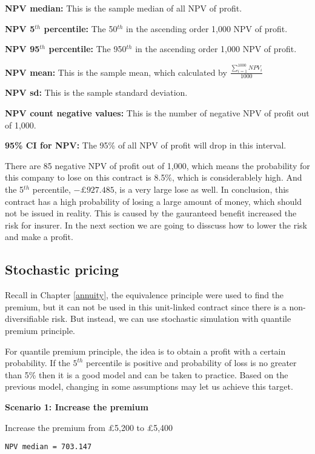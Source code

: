 \documentclass{report}
\begin{document}
{\textbf{NPV median:} This is the sample median of all NPV of profit.

\textbf{NPV 5$^{th}$ percentile:} The 50$^{th}$ in the ascending order 1,000 NPV of profit.

\textbf{NPV 95$^{th}$ percentile:} The 950$^{th}$ in the ascending order 1,000 NPV of profit.

\textbf{NPV mean:} This is the sample mean, which calculated by $\frac{\sum_{i=1}^{1000} NPV_i}{1000}$

\textbf{NPV sd:} This is the sample standard deviation. 

\textbf{NPV count negative values:} This is the number of negative NPV of profit out of 1,000.

\textbf{95\% CI for NPV:} The 95\% of all NPV of profit will drop in this interval.


There are 85 negative NPV of profit out of 1,000, which means the probability for this company to lose on this contract is 8.5\%, which is considerablely high. And the 5$^{th}$ percentile, ${-\pounds927.485}$, is a very large lose as well. In conclusion, this contract has a high probability of losing a large amount of money, which should not be issued in reality. This is caused by the gauranteed benefit increased the risk for insurer. In the next section we are going to disscuss how to lower the risk and make a profit.


\subsection{Stochastic pricing}

Recall in Chapter \ref{annuity}, the equivalence principle were used to find the premium, but it can not be used in this unit-linked contract since there is a non-diversifiable risk. But instead, we can use stochastic simulation with quantile premium principle\cite{bib:quantile-premium}. 

For quantile premium principle, the idea is to obtain a profit with a certain probability. If the $5^{th}$ percentile is positive and probability of loss is no greater than 5\% then it is a good model and can be taken to practice. Based on the previous model, changing in some assumptions may let us achieve this target. 

\textbf{Scenario 1: Increase the premium}

Increase the premium from \pounds5,200 to \pounds5,400

\texttt{NPV median = 703.147}

}
\end{document}
